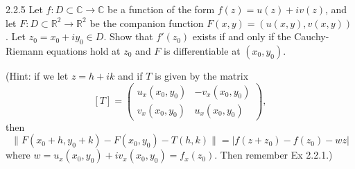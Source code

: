 \documentclass[12pt]{article}
\begin{document}
\newpage


\begin{problem}{2.2.5}
    Let \( f : D \subset \mathbb{C} \to \mathbb{C} \) be a function of the form \( f(z) = u(z) + i v(z) \), and let \( F : D \subset \mathbb{R}^2 \to \mathbb{R}^2 \) be the companion function \( F(x,y) = (u(x,y), v(x,y)) \). Let \( z_0 = x_0 + i y_0 \in D \). Show that \( f'(z_0) \) exists if and only if the Cauchy-Riemann equations hold at \( z_0 \) and \( F \) is differentiable at \( (x_0, y_0) \).
    
    (Hint: if we let \( z = h + i k \) and if \( T \) is given by the matrix
    \[ [T] =  \begin{pmatrix}
        u_x(x_0,y_0) & -v_x(x_0,y_0) \\
        v_x(x_0,y_0) & u_x(x_0,y_0)
    \end{pmatrix}, \]
    then
    \[ \|F(x_0 + h, y_0 + k) - F(x_0, y_0) - T(h,k)\| = |f(z + z_0) - f(z_0) - w z| \]
    where \( w = u_x(x_0,y_0) + i v_x(x_0,y_0) = f_x(z_0) \). Then remember Ex 2.2.1.)
\end{problem}

\begin{solution}
    \bbni    
\end{solution}
\end{document}
